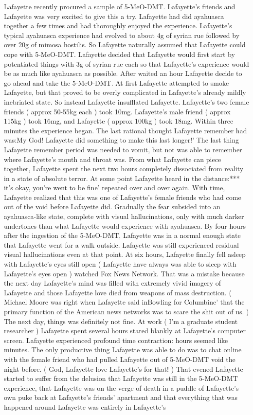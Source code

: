 \documentclass[12pt]{book}
\begin{document}
Lafayette recently procured a sample of 5-MeO-DMT. Lafayette's friends and Lafayette was very excited to give this a try. Lafayette had did ayahuasca together a few times and had thoroughly enjoyed the experience. Lafayette's typical ayahuasca experience had evolved to about 4g of syrian rue followed by over 20g of mimosa hostilis. So Lafayette naturally assumed that Lafayette could cope with 5-MeO-DMT. Lafayette decided that Lafayette would first start by potentiated things with 3g of syrian rue each so that Lafayette's experience would be as much like ayahuasca as possible. After waited an hour Lafayette decide to go ahead and take the 5-MeO-DMT. At first Lafayette attempted to smoke Lafayette, but that proved to be overly complicated in Lafayette's already mildly inebriated state. So instead Lafayette insufflated Lafayette. Lafayette's two female friends ( approx 50-55kg each ) took 10mg. Lafayette's male friend ( approx 115kg ) took 16mg, and Lafayette ( approx 100kg ) took 18mg. Within three minutes the experience began. The last rational thought Lafayette remember had was:My God! Lafayette did something to make this last longer!' The last thing Lafayette remember period was needed to vomit, but not was able to remember where Lafayette's mouth and throat was. From what Lafayette can piece together, Lafayette spent the next two hours completely dissociated from reality in a state of absolute terror. At some point Lafayette heard in the distance:*** it's okay, you're went to be fine' repeated over and over again. With time, Lafayette realized that this was one of Lafayette's female friends who had come out of the void before Lafayette did. Gradually the fear subsided into an ayahuasca-like state, complete with visual hallucinations, only with much darker undertones than what Lafayette would experience with ayahuasca. By four hours after the ingestion of the 5-MeO-DMT, Lafayette was in a normal enough state that Lafayette went for a walk outside. Lafayette was still experienced residual visual hallucinations even at that point. At six hours, Lafayette finally fell asleep with Lafayette's eyes still open ( Lafayette have always was able to sleep with Lafayette's eyes open ) watched Fox News Network. That was a mistake because the next day Lafayette's mind was filled with extremely vivid imagery of Lafayette and those Lafayette love died from weapons of mass destruction. ( Michael Moore was right when Lafayette said inBowling for Columbine' that the primary function of the American news networks was to scare the shit out of us. ) The next day, things was definitely not fine. At work ( I'm a graduate student researcher ) Lafayette spent several hours stared blankly at Lafayette's computer screen. Lafayette experienced profound time contraction: hours seemed like minutes. The only productive thing Lafayette was able to do was to chat online with the female friend who had pulled Lafayette out of 5-MeO-DMT void the night before. ( God, Lafayette love Lafayette's for that! ) That evened Lafayette started to suffer from the delusion that Lafayette was still in the 5-MeO-DMT experience, that Lafayette was on the verge of death in a puddle of Lafayette's own puke back at Lafayette's friends' apartment and that everything that was happened around Lafayette was entirely in Lafayette's 
\end{document}
